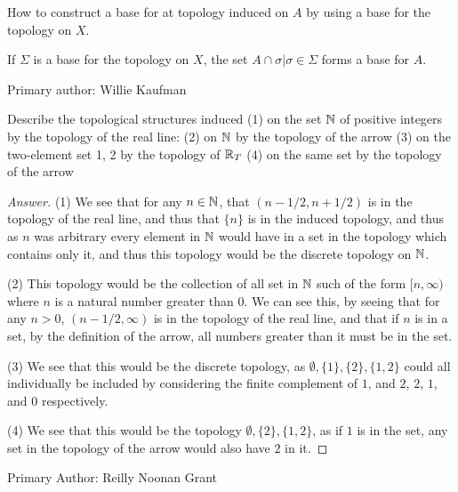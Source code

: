 \begin{minorEx}[Riddle]%
How to construct a base for at topology induced on $A$ by using a base for the topology on $X$.
\end{minorEx}
If $\Sigma$ is a base for the topology on $X$, the set ${A \cap \sigma | \sigma \in \Sigma}$ forms a base for $A$. 

Primary author: Willie Kaufman

\begin{minorEx}%
Describe the topological structures induced
(1) on the set $\mathbb{N}$ of positive integers by the topology of the real line:
(2) on $\mathbb{N}$ by the topology of the arrow
(3) on the two-element set {1, 2} by the topology of $\mathbb{R}_T$
(4) on the same set by the topology of the arrow
\end{minorEx}

\begin{proof}[Answer]
  (1) We see that for any $n\in \mathbb{N}$, that $(n-1/2, n+1/2)$ is in the
  topology of the real line, and thus that $\{n\}$ is in the induced
  topology, and thus as $n$ was arbitrary every element in $\mathbb{N}$ would
  have in a set in the topology which contains only it, and thus this
  topology would be the discrete topology on $\mathbb{N}$.

  (2) This topology would be the collection of all set in $\mathbb{N}$ such
  of the form $[n, \infty)$ where $n$ is a natural number greater than
  $0$. We can see this, by seeing that for any $n>0$, $(n-1/2,\infty)$
  is in the topology of the real line, and that if $n$ is in a set, by
  the definition of the arrow, all numbers greater than it must be in
  the set.
  
  (3) We see that this would be the discrete topology, as
  $\emptyset,\{1\},\{2\}, \{1,2\}$ could all individually be included
    by considering the finite complement of $1$, and $2$, $2$, $1$,
    and $0$ respectively.

  (4) We see that this would be the topology $\emptyset,\{2\},
  \{1,2\}$, as if $1$ is in the set, any set in the topology of the
  arrow would also have $2$ in it.
\end{proof}
Primary Author: Reilly Noonan Grant


